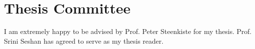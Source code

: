 \section{Thesis Committee}
I am extremely happy to be advised by Prof. Peter Steenkiste for my
thesis. Prof. Srini Seshan has agreed to serve as my thesis reader.
